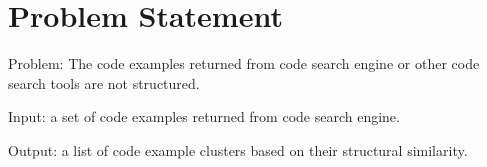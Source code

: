 \section{Problem Statement}

Problem: The code examples returned from code search engine or other code search tools are not structured. 



Input: a set of code examples returned from code search engine.

Output: a list of code example clusters based on their structural similarity. 








